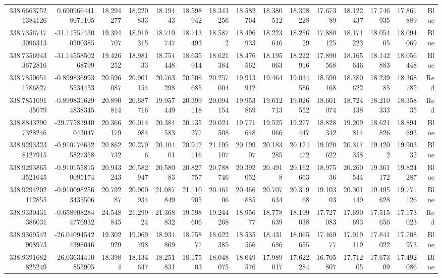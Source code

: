 \begin{center}
\begin{longtable}{rrrrrrrrrrrrrrr}
338.66637521384126 & 0.6909664418071105 & 18.294277 & 18.220833 & 18.19443 & 18.598942 & 18.343256 & 18.582764 & 18.380512 & 18.398228 & 17.67389 & 18.122437 & 17.746935 & 17.861889 & Blue \\
338.73567173096313 & -31.145574300500385 & 19.394707 & 18.919315 & 18.710747 & 18.713493 & 18.5872 & 18.496933 & 18.223646 & 18.25629 & 17.880125 & 18.171223 & 18.05405 & 18.094069 & Blue \\
338.73569433672816 & -31.1455850268799 & 19.426252 & 18.98133 & 18.754448 & 18.635914 & 18.621384 & 18.476562 & 18.195063 & 18.222916 & 17.890568 & 18.165646 & 18.142883 & 18.056448 & Blue \\
338.78506511786827 & -0.8998369935534453 & 20.596087 & 20.901154 & 20.763298 & 20.506685 & 20.257004 & 19.913912 & 19.464 & 19.034586 & 18.590168 & 18.780622 & 18.23985 & 18.368782 & Red \\
338.785109135079 & -0.8998316294838345 & 20.890814 & 20.687716 & 19.957449 & 20.399118 & 20.094154 & 19.953869 & 19.612713 & 19.026552 & 18.601074 & 18.724138 & 18.210333 & 18.35835 & Red \\
338.88432907328246 & -29.77583940043047 & 20.366179 & 20.014984 & 20.384583 & 20.135277 & 20.024508 & 19.771648 & 19.525066 & 19.277447 & 18.828342 & 19.209814 & 18.621826 & 18.894693 & Blue \\
338.92933238127915 & -0.9101766325827358 & 20.862732 & 20.2796 & 20.10401 & 20.942116 & 21.195107 & 20.19907 & 20.183285 & 20.124472 & 19.020622 & 20.317358 & 19.4202 & 19.90332 & Blue \\
338.92938653521645 & -0.9101558150095174 & 20.943243 & 20.582947 & 20.58083 & 20.827757 & 20.788746 & 20.392052 & 20.4918 & 20.162663 & 18.97536 & 20.260544 & 19.361172 & 19.824287 & Blue \\
338.9294202112855 & -0.9100982563435506 & 20.79287 & 20.900934 & 21.087849 & 21.110905 & 20.46106 & 20.466885 & 20.707634 & 20.31968 & 19.10303 & 20.301449 & 19.495628 & 19.771126 & Blue \\
338.9330431386031 & -0.6589082844776932 & 24.548845 & 21.29924 & 21.368832 & 19.598606 & 19.244268 & 18.95677 & 18.778639 & 18.199038 & 17.727083 & 17.690693 & 17.515656 & 17.173023 & Red \\
338.9369542908973 & -26.040945424398046 & 19.302929 & 19.069798 & 18.934809 & 18.75877 & 18.622385 & 18.535566 & 18.431686 & 18.065655 & 17.46977 & 17.919119 & 17.841022 & 17.708973 & Blue \\
338.9391682825249 & -26.03634410855905 & 18.3984 & 18.134647 & 18.251831 & 18.17503 & 18.048075 & 18.049576 & 17.989017 & 17.622284 & 16.705807 & 17.71205 & 17.67309 & 17.492086 & Blue \\

\end{longtable}
\end{center}
